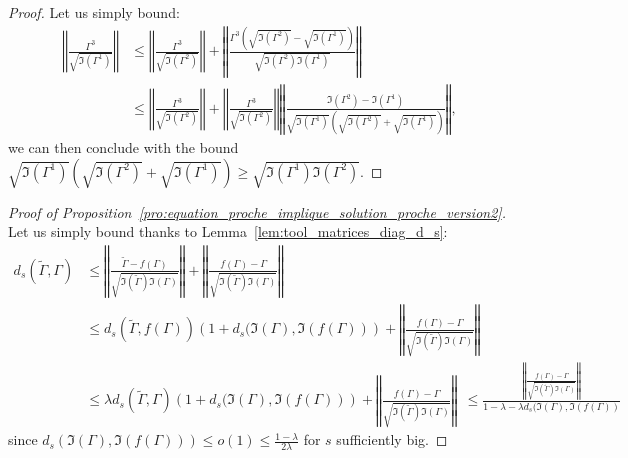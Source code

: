 \documentclass[a4papaer, titlepage]{book}
\begin{document}
  \begin{proof}
    Let us simply bound:
    \begin{align*}
      \left\Vert \frac{\Gamma^3}{\sqrt{\Im(\Gamma^1) }}\right\Vert  
      &\leq \left\Vert \frac{\Gamma^3}{\sqrt{ \Im(\Gamma^2)}}\right\Vert + \left\Vert \frac{\Gamma^3 \left( \sqrt{\Im(\Gamma^2)} - \sqrt{\Im(\Gamma^1)} \right)}{\sqrt{\Im(\Gamma^2) \Im(\Gamma^1)}} \right\Vert \\
      &\leq \left\Vert \frac{\Gamma^3}{\sqrt{ \Im(\Gamma^2)}}\right\Vert +  \left\Vert \frac{\Gamma^3}{\sqrt{ \Im(\Gamma^2)}}\right\Vert \left\Vert \frac{\Im(\Gamma^2) - \Im(\Gamma^1)}{\sqrt{\Im(\Gamma^1)} \left(\sqrt{\Im(\Gamma^2)} +\sqrt{\Im(\Gamma^1)}\right)} \right\Vert,
    \end{align*}
    we can then conclude with the bound $\sqrt{\Im(\Gamma^1)} \left(\sqrt{\Im(\Gamma^2)} +\sqrt{\Im(\Gamma^1)}\right) \geq \sqrt{\Im(\Gamma^1)\Im(\Gamma^2)}$.
  \end{proof}
    \begin{proof}[Proof of Proposition~\ref{pro:equation_proche_implique_solution_proche_version2}]
    Let us simply bound thanks to Lemma~\ref{lem:tool_matrices_diag_d_s}:
  \begin{align*}
    d_s(\tilde \Gamma , \Gamma)
    &\leq  \left\Vert \frac{\tilde \Gamma - f(\Gamma)}{\sqrt{\Im(\tilde \Gamma) \Im(\Gamma)}}\right\Vert + \left\Vert \frac{f(\Gamma) - \Gamma}{\sqrt{\Im(\tilde \Gamma) \Im(\Gamma)}}\right\Vert\\
    &\leq  d_s \left(\tilde \Gamma,f(\Gamma) \right)\left(1 + d_s(\Im(\Gamma), \Im(f(\Gamma))\right) + \left\Vert \frac{f(\Gamma) - \Gamma}{\sqrt{\Im(\tilde \Gamma) \Im(\Gamma)}}\right\Vert\\
    &\leq  \lambda d_s \left(\tilde \Gamma,\Gamma \right)\left(1 + d_s(\Im(\Gamma), \Im(f(\Gamma))\right) + \left\Vert \frac{f(\Gamma) - \Gamma}{\sqrt{\Im(\tilde \Gamma) \Im(\Gamma)}}\right\Vert\ \
    \leq  \frac{\left\Vert \frac{f(\Gamma) - \Gamma}{\sqrt{\Im(\tilde \Gamma) \Im(\Gamma)}}\right\Vert}{1 - \lambda- \lambda d_s(\Im(\Gamma), \Im(f(\Gamma))} 
  \end{align*}
  since $d_s(\Im(\Gamma), \Im(f(\Gamma))) \leq o(1) \leq \frac{1-\lambda}{2\lambda}$ for $s$ sufficiently big.

  \end{proof}
\end{document}
